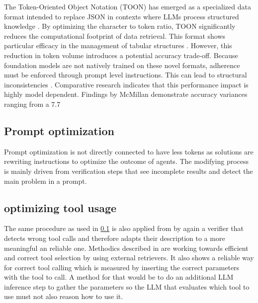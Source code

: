 \documentclass[10pt,twocolumn,letterpaper]{article}
\begin{document}
The Token-Oriented Object Notation (TOON) has emerged as a specialized data format intended to replace JSON in contexts where LLMs process structured knowledge \citep{Alshaer, Lafalce_2025, Masciari_Moscato_Napolitano_Orlando_Perillo_Russo_2026, McMillan_2026, Mudbari_Bhagat_2026, Matveev_2026}. By optimizing the character to token ratio, TOON significantly reduces the computational footprint of data retrieval. This format shows particular efficacy in the management of tabular structures \citep{Lafalce_2025, Masciari_Moscato_Napolitano_Orlando_Perillo_Russo_2026, McMillan_2026, Matveev_2026}. However, this reduction in token volume introduces a potential accuracy trade-off. Because foundation models are not natively trained on these novel formats, adherence must be enforced through prompt level instructions. This can lead to structural inconsistencies \citep{Masciari_Moscato_Napolitano_Orlando_Perillo_Russo_2026}. Comparative research indicates that this performance impact is highly model dependent. Findings by McMillan \citep{McMillan_2026} demonstrate accuracy variances ranging from a 7.7%

\subsection{Prompt optimization}
\label{subsec:prompt_optimization}
Prompt optimization is not directly connected to have less tokens as solutions \citep{Wu_Meij_Yilmaz_2025, Nandagopal_2025} are rewriting instructions to optimize the outcome of agents. The modifying process is mainly driven from verification steps that see incomplete results and detect the main problem in a prompt.

\subsection{optimizing tool usage}
The same procedure as used in \ref{subsec:prompt_optimization} is also applied from \cite{Wu_Meij_Yilmaz_2025} by again a verifier that detects wrong tool calls and therefore adapts their description to a more meaningful an reliable one. Methodics described in \citep{Yang_Li_Zhou_Zhu_Qu_Fan_Wei_Ye_Kang_Qin_et_al._2026} are working towards efficient and correct tool selection by using external retrievers. It also shows a reliable way for correct tool calling which is measured by inserting the correct parameters with the tool to call. A method for that would be to do an additional LLM inference step to gather the parameters so the LLM that evaluates which tool to use must not also reason how to use it. 
\end{document}

